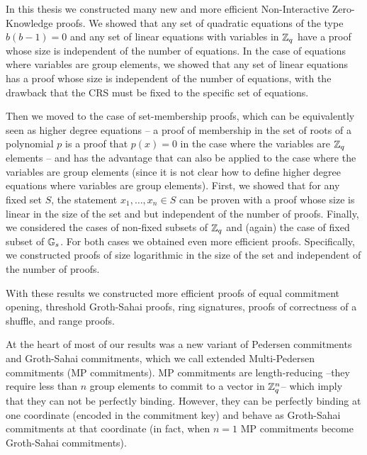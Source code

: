 In this thesis we constructed many new and more efficient Non-Interactive Zero-Knowledge proofs. We showed that any set of quadratic equations of the type $b(b-1)=0$ and any set of linear equations with variables in $\mathbb{Z}_q$ have a proof whose size is independent of the number of equations. In the case of equations where variables are group elements, we showed that any set of linear equations has a proof whose size is independent of the number of equations, with the drawback that the CRS must be fixed to the specific set of equations.

Then we moved to the case of set-membership proofs, which can be equivalently seen as higher degree equations -- a proof of membership in the set of roots of a polynomial $p$ is a proof that $p(x)=0$ in the case where the variables are $\mathbb{Z}_q$ elements -- and has the advantage that can also be applied to the case where the variables are group elements (since it is not clear how to define higher degree equations where variables are group elements). First, we showed that for any fixed set $S$, the statement $x_1,\ldots,x_n\in S$ can be proven with a proof whose size is linear in the size of the set and but independent of the number of proofs. 
Finally, we considered the cases of non-fixed subsets of $\mathbb{Z}_q$ and (again) the case of fixed subset of $\mathbb{G}_s$. For both cases we obtained even more efficient proofs. Specifically, we constructed proofs of size logarithmic in the size of the set and independent of the number of proofs.

With these results we constructed more efficient proofs of equal commitment opening, threshold Groth-Sahai proofs, ring signatures, proofs of correctness of a shuffle, and range proofs.

At the heart of most of our results was a new variant of Pedersen commitments and Groth-Sahai commitments, which we call extended Multi-Pedersen commitments (MP commitments). MP commitments are length-reducing --they require less than $n$ group elements to commit to a vector in $\mathbb{Z}_q^n$-- which imply that they can not be perfectly binding. However, they can be perfectly binding at one coordinate (encoded in the commitment key) and behave as Groth-Sahai commitments at that coordinate (in fact, when $n=1$ MP commitments become Groth-Sahai commitments).

